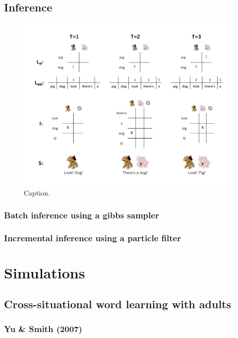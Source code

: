 \documentclass[man,noapacite]{apa2}
\begin{document}
\subsection{Inference}
\begin{figure}[tr]
\begin{center}
\includegraphics[width=6.5in]{figures/inference_diagram.pdf}
\caption{\label{fig:inference_diagram} Caption.}
\end{center}
\end{figure}

\subsubsection{Batch inference using a gibbs sampler}

\subsubsection{Incremental inference using a particle filter}

\section{Simulations}

\subsection{Cross-situational word learning with adults}

\subsubsection{Yu \& Smith (2007)}
\end{document}
